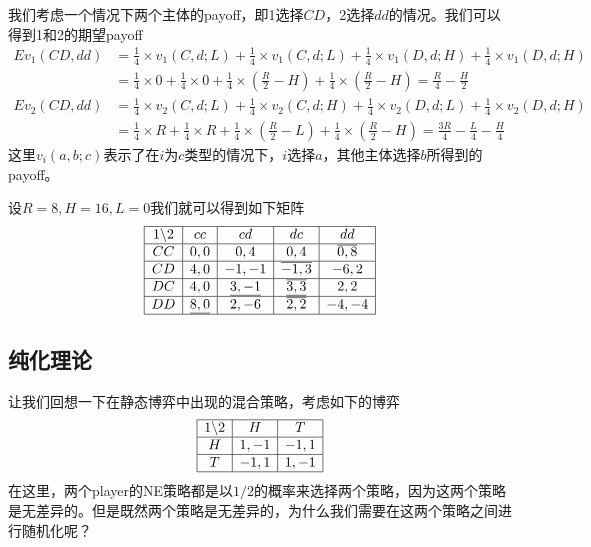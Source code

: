 \documentclass[UTF8,12pt]{ctexart}
\numberwithin{equation}{section} %
\numberwithin{figure}{section}
\numberwithin{table}{section}
\begin{document}
	我们考虑一个情况下两个主体的payoff，即1选择$CD$，2选择$dd$的情况。我们可以得到1和2的期望payoff
	\begin{equation}
		\begin{aligned}
			Ev_1(CD,dd) &= \frac{1}{4} \times v_1(C,d;L) + \frac{1}{4} \times v_1(C,d;L) + \frac{1}{4} \times v_1(D,d;H) + \frac{1}{4} \times v_1(D,d;H) \\
			&= \frac{1}{4} \times 0 + \frac{1}{4} \times 0 + \frac{1}{4} \times (\frac{R}{2} - H) + \frac{1}{4} \times (\frac{R}{2} - H) = \frac{R}{4} - \frac{H}{2}
		\end{aligned}
	\end{equation}
	\begin{equation}
		\begin{aligned}
			Ev_2(CD,dd) &= \frac{1}{4} \times v_2(C,d;L) + \frac{1}{4} \times v_2(C,d;H) + \frac{1}{4} \times v_2(D,d;L) + \frac{1}{4} \times v_2(D,d;H)  \\
			&= \frac{1}{4} \times R + \frac{1}{4} \times R + \frac{1}{4} \times (\frac{R}{2} - L) + \frac{1}{4} \times (\frac{R}{2} - H) = \frac{3R}{4} - \frac{L}{4} - \frac{H}{4}
		\end{aligned}
	\end{equation}
	这里$v_i(a,b;c)$表示了在$i$为$c$类型的情况下，$i$选择$a$，其他主体选择$b$所得到的payoff。

	设$R=8,H=16,L=0$我们就可以得到如下矩阵
	\begin{equation}
		\begin{array}{|c|c|c|c|c|c|}
			\hline
			1 \backslash 2 & cc & cd & dc & dd \\
			\hline
			CC & 0,0 & 0,4 & 0,4 & \overline{0,8}\\
			\hline
			CD & 4,0 & -1,-1 & \overline{-1,3} & -6,2 \\
			\hline
			DC & 4,0 & \underline{3,-1} & \underline{\overline{3,3}} & 2,2 \\
			\hline
			DD & \underline{8,0} & 2,-6 & \overline{2,2} & -4,-4\\
			\hline
		\end{array}
	\end{equation}

	\subsection{纯化理论}
	让我们回想一下在静态博弈中出现的混合策略，考虑如下的博弈
	\begin{equation}
		\begin{array}{|c|c|c|}
			\hline
			1 \backslash 2 & H & T \\
			\hline
			H & 1,-1 & -1,1 \\
			\hline
			T & -1,1 & 1,-1 \\
			\hline
		\end{array}
	\end{equation}
	在这里，两个player的NE策略都是以$1/2$的概率来选择两个策略，因为这两个策略是无差异的。但是既然两个策略是无差异的，为什么我们需要在这两个策略之间进行随机化呢？
	
\end{document}
